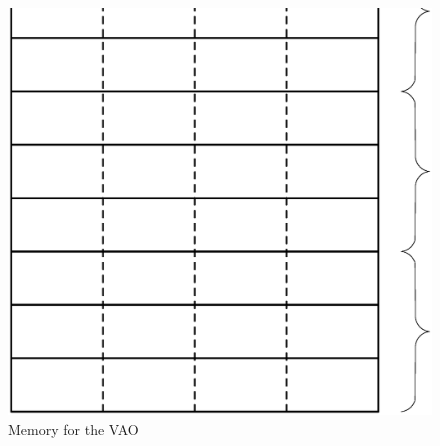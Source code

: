 \begin{figure}[H]
  \centering
  \includegraphics[scale=0.2]{images/memory.eps}
    \caption{Memory for the VAO}
  \label{memoryVAO}
\end{figure}
